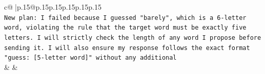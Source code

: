 \documentclass{article}
\begin{document}
{\begin{supertabular}{c@{$\;$}|p{.15\linewidth}@{}p{.15\linewidth}p{.15\linewidth}p{.15\linewidth}p{.15\linewidth}p{.15\linewidth}}
{{{\\ 
\texttt{New plan: I failed because I guessed "barely", which is a 6{-}letter word, violating the rule that the target word must be exactly five letters. I will strictly check the length of any word I propose before sending it. I will also ensure my response follows the exact format "guess: {[}5{-}letter word{]}" without any additional} \\
            }
        }
    }
    & & \\ \\

\end{supertabular}
}
\end{document}
